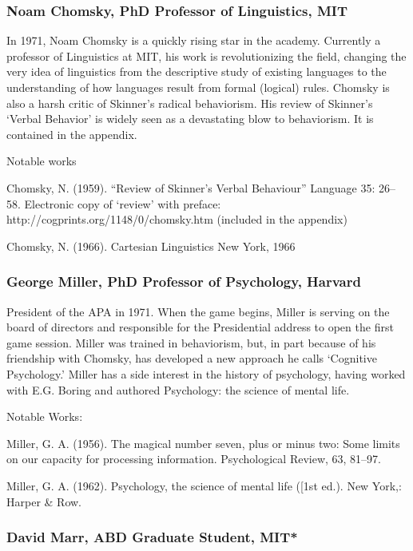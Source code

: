 \subsubsection{Noam Chomsky, PhD Professor of Linguistics, MIT}
\label{noamchomskyphdprofessoroflinguisticsmit}

In 1971, Noam Chomsky is a quickly rising star in the academy. Currently a professor of Linguistics at MIT, his work is revolutionizing the field, changing the very idea of linguistics from the descriptive study of existing languages to the understanding of how languages result from formal (logical) rules. Chomsky is also a harsh critic of Skinner's radical behaviorism. His review of Skinner's `Verbal Behavior' is widely seen as a devastating blow to behaviorism. It is contained in the appendix.

Notable works

Chomsky, N. (1959). ``Review of Skinner's Verbal Behaviour'' Language 35: 26--58. Electronic copy of ‘review’ with preface: http:\slash \slash cogprints.org\slash 1148\slash 0\slash chomsky.htm (included in the appendix)

Chomsky, N. (1966). Cartesian Linguistics New York, 1966

\subsubsection{George Miller, PhD Professor of Psychology, Harvard}
\label{georgemillerphdprofessorofpsychologyharvard}

President of the APA in 1971. When the game begins, Miller is serving on the board of directors and responsible for the Presidential address to open the first game session. Miller was trained in behaviorism, but, in part because of his friendship with Chomsky, has developed a new approach he calls `Cognitive Psychology.' Miller has a side interest in the history of psychology, having worked with E.G. Boring and authored Psychology: the science of mental life.

Notable Works:

Miller, G. A. (1956). The magical number seven, plus or minus two: Some limits on our capacity for processing information. Psychological Review, 63, 81--97.

Miller, G. A. (1962). Psychology, the science of mental life ([1st ed.). New York,: Harper \& Row.

\subsubsection{David Marr, ABD Graduate Student, MIT*}
\label{davidmarrabdgraduatestudentmit}

